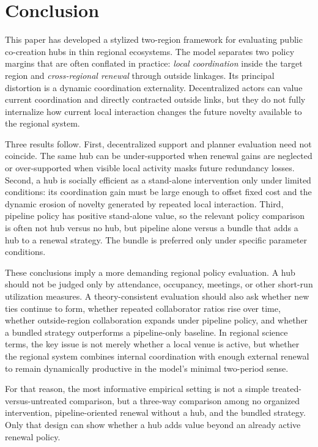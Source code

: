 \section{Conclusion}
\label{sec:conclusion}

This paper has developed a stylized two-region framework for evaluating public co-creation hubs in thin regional ecosystems. The model separates two policy margins that are often conflated in practice: \emph{local coordination} inside the target region and \emph{cross-regional renewal} through outside linkages. Its principal distortion is a dynamic coordination externality. Decentralized actors can value current coordination and directly contracted outside links, but they do not fully internalize how current local interaction changes the future novelty available to the regional system.

Three results follow. First, decentralized support and planner evaluation need not coincide. The same hub can be under-supported when renewal gains are neglected or over-supported when visible local activity masks future redundancy losses. Second, a hub is socially efficient as a stand-alone intervention only under limited conditions: its coordination gain must be large enough to offset fixed cost and the dynamic erosion of novelty generated by repeated local interaction. Third, pipeline policy has positive stand-alone value, so the relevant policy comparison is often not hub versus no hub, but pipeline alone versus a bundle that adds a hub to a renewal strategy. The bundle is preferred only under specific parameter conditions.

These conclusions imply a more demanding regional policy evaluation. A hub should not be judged only by attendance, occupancy, meetings, or other short-run utilization measures. A theory-consistent evaluation should also ask whether new ties continue to form, whether repeated collaborator ratios rise over time, whether outside-region collaboration expands under pipeline policy, and whether a bundled strategy outperforms a pipeline-only baseline. In regional science terms, the key issue is not merely whether a local venue is active, but whether the regional system combines internal coordination with enough external renewal to remain dynamically productive in the model's minimal two-period sense.

For that reason, the most informative empirical setting is not a simple treated-versus-untreated comparison, but a three-way comparison among no organized intervention, pipeline-oriented renewal without a hub, and the bundled strategy. Only that design can show whether a hub adds value beyond an already active renewal policy.

